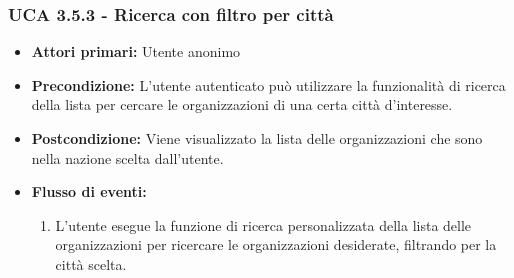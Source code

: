\subsubsection{UCA 3.5.3 - Ricerca con filtro per città}%
\begin{itemize}
	\item \textbf{Attori primari:} Utente anonimo
	\item \textbf{Precondizione:} L'utente autenticato può utilizzare la funzionalità di ricerca della lista per cercare le organizzazioni di una certa città d'interesse.
	\item \textbf{Postcondizione:} Viene visualizzato la lista delle organizzazioni che sono nella nazione scelta dall'utente.
	\item \textbf{Flusso di eventi:}
	\begin{enumerate}
		\item L'utente esegue la funzione di ricerca personalizzata della lista delle organizzazioni per ricercare le organizzazioni desiderate, filtrando per la città scelta.
	\end{enumerate}
\end{itemize}

